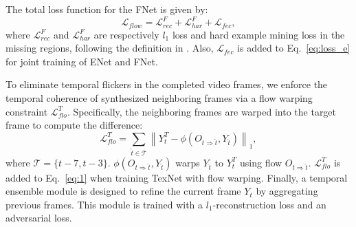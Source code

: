The total loss function for the FNet is given by:
\begin{equation}
	\label{eq:flow_all}
	\mathcal{L}_{flow}=   \mathcal{L}^F_{rec}+ \mathcal{L}^F_{har}+\mathcal{L}_{fec},
\end{equation}
where $\mathcal{L}^F_{rec}$ and $\mathcal{L}^F_{har}$ are respectively $l_1$ loss and hard example mining loss in the missing regions, following the definition in \cite{Xu_2019_CVPR}. 
Also, $\mathcal{L}_{fec}$ is added to Eq.~\eqref{eq:loss_e} for joint training of ENet and FNet.


To eliminate temporal flickers in the completed video frames, we enforce the temporal coherence of synthesized neighboring frames via a flow warping constraint $\mathcal{L}^T_{flo}$. 
%
Specifically, the neighboring frames are warped into the target frame to compute the difference: 
\begin{equation}
	\label{eq:inp_flow}
	\mathcal{L}^T_{flo}=\sum_{\widehat{t}\in\mathcal{T}}\left\| Y^T_t-\phi(O_{t\Rightarrow \widehat{t}},Y_{\widehat{t}}) \right\|_1,
\end{equation}
where $\mathcal{T}=\{t-7,t-3\}$. $\phi(O_{t\Rightarrow \widehat{t}},Y_{\widehat{t}})$ warps $Y_{\widehat{t}}$ to $Y^T_{t}$ using flow $O_{t\Rightarrow \widehat{t}}$.
%
$\mathcal{L}^T_{flo}$ is added to Eq.~\eqref{eq:1} when training TexNet with flow warping.
Finally, a temporal ensemble module is designed to refine the current frame $Y_t$ by aggregating previous frames. %
This module is trained with a $l_1$-reconstruction loss and an adversarial loss.







